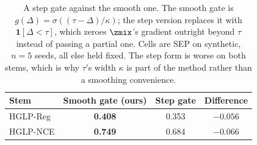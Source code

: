 \begin{table}[!tb]
\caption{A step gate against the smooth one. The smooth gate is
$g(\Delta)=\sigma((\tau-\Delta)/\kappa)$; the step version replaces it with
$\mathbf{1}[\Delta<\tau]$, which zeroes $\zmix$'s gradient outright beyond $\tau$
instead of passing a partial one. Cells are SEP on synthetic, $n=5$ seeds, all else
held fixed. The step form is worse on both stems, which is why $\tau$'s width
$\kappa$ is part of the method rather than a smoothing convenience.}
\label{tab:gatehard}
\centering
\small
\begin{tabular}{lccc}
\hline
Stem & Smooth gate (ours) & Step gate & Difference \\
\hline
HGLP-Reg & \textbf{0.408} & 0.353 & $-0.056$ \\
HGLP-NCE & \textbf{0.749} & 0.684 & $-0.066$ \\
\hline
\end{tabular}
\end{table}
